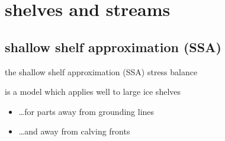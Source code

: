 
\section{shelves and streams}

\subsection{shallow shelf approximation (SSA)}

\begin{frame}{the shallow shelf approximation (SSA) stress balance}
  
is a model which applies well to large ice shelves
\begin{itemize}
\item \dots for parts away from grounding lines
\item \dots and away from calving fronts
\end{itemize}

\end{frame}


